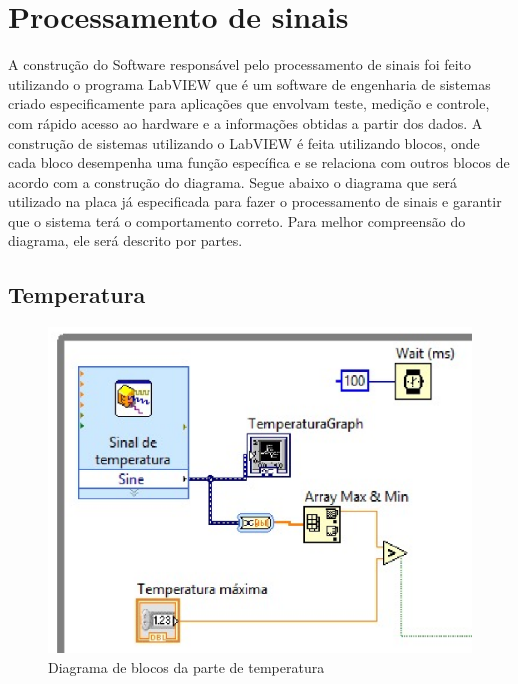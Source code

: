 \section{Processamento de sinais}

A construção do Software responsável pelo processamento de sinais foi feito utilizando o programa LabVIEW que é um software de engenharia de sistemas criado especificamente para aplicações que envolvam teste, medição e controle, com rápido acesso ao hardware e a informações obtidas a partir dos dados.
A construção de sistemas utilizando o LabVIEW é feita utilizando blocos, onde cada bloco desempenha uma função específica e se relaciona com outros blocos de acordo com a construção do diagrama.
Segue abaixo o diagrama que será utilizado na placa já especificada para fazer o processamento de sinais e garantir que o sistema terá o comportamento correto. Para melhor compreensão do diagrama, ele será descrito por partes.

\subsection{Temperatura}

\begin{figure}[!htb]                                                               
    \centering                                                                      
    \includegraphics[scale=0.6, keepaspectratio=true]{figuras/detalhado/temp_labview.eps} 
    \caption{Diagrama de blocos da parte de temperatura}
 \end{figure}

